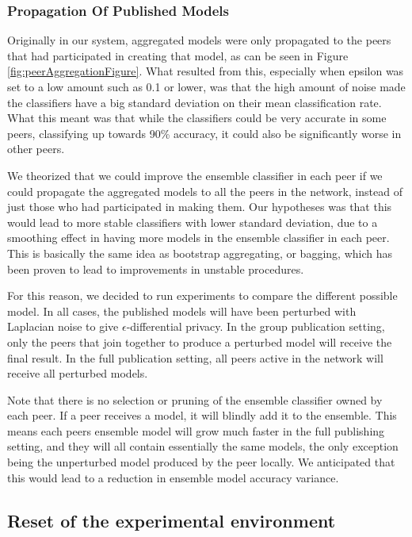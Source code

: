 \subsubsection{Propagation Of Published Models} \label{sec:PropagationPubModel}

Originally in our system, aggregated models were only propagated to the peers that had participated in creating that model, as can be seen in Figure \ref{fig:peerAggregationFigure}. What resulted from this, especially when epsilon was set to a low amount such as 0.1 or lower, was that the high amount of noise made the classifiers have a big standard deviation on their mean classification rate. What this meant was that while the classifiers could be very accurate in some peers, classifying up towards 90\% accuracy, it could also be significantly worse in other peers. 

We theorized that we could improve the ensemble classifier in each peer if we could propagate the aggregated models to all the peers in the network, instead of just those who had participated in making them. Our hypotheses was that this would lead to more stable classifiers with lower standard deviation, due to a smoothing effect in having more models in the ensemble classifier in each peer. This is basically the same idea as bootstrap aggregating, or bagging, which has been proven to lead to improvements in unstable procedures\citep{breiman1996bagging}. 

For this reason, we decided to run experiments to compare the different possible model. In all cases, the published models will have been perturbed with Laplacian noise to give $\epsilon$-differential privacy. In the group publication setting, only the peers that join together to produce a perturbed model will receive the final result. In the full publication setting, all peers active in the network will receive all perturbed models. 

Note that there is no selection or pruning of the ensemble classifier owned by each peer. If a peer receives a model, it will blindly add it to the ensemble. This means each peers ensemble model will grow much faster in the full publishing setting, and they will all contain essentially the same models, the only exception being the unperturbed model produced by the peer locally. We anticipated that this would lead to a reduction in ensemble model accuracy variance.


\subsection{Reset of the experimental environment}

